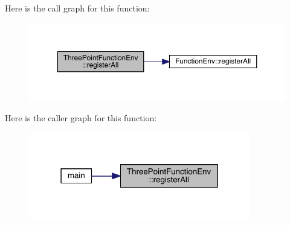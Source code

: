 Here is the call graph for this function\+:
\nopagebreak
\begin{figure}[H]
\begin{center}
\leavevmode
\includegraphics[width=350pt]{de/def/namespaceThreePointFunctionEnv_abdb789af6b21bd1a942b31da7b443b1b_cgraph}
\end{center}
\end{figure}
Here is the caller graph for this function\+:
\nopagebreak
\begin{figure}[H]
\begin{center}
\leavevmode
\includegraphics[width=274pt]{de/def/namespaceThreePointFunctionEnv_abdb789af6b21bd1a942b31da7b443b1b_icgraph}
\end{center}
\end{figure}
